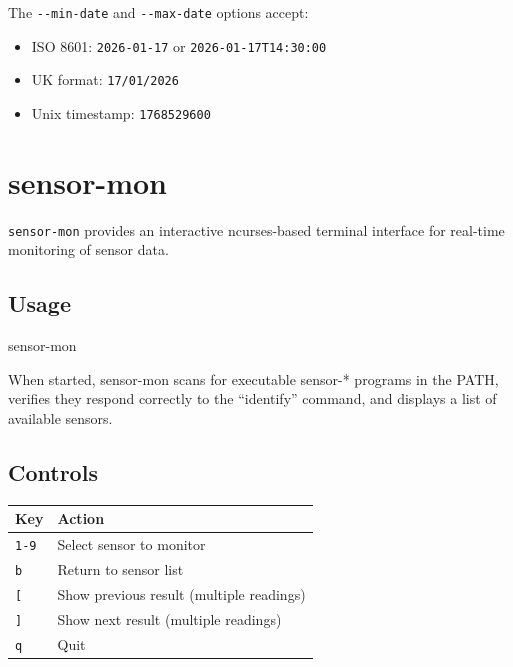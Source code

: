 \documentclass[
]{book}
\newenvironment{Shaded}{\begin{snugshade}}{\end{snugshade}}
\newcommand{\ExtensionTok}[1]{#1}
\providecommand{\tightlist}{%
  \setlength{\itemsep}{0pt}\setlength{\parskip}{0pt}}
\begin{document}
The \texttt{-\/-min-date} and \texttt{-\/-max-date} options accept:

\begin{itemize}
\tightlist
\item
  ISO 8601: \texttt{2026-01-17} or \texttt{2026-01-17T14:30:00}
\item
  UK format: \texttt{17/01/2026}
\item
  Unix timestamp: \texttt{1768529600}
\end{itemize}

\section{sensor-mon}\label{sensor-mon}

\texttt{sensor-mon} provides an interactive ncurses-based terminal interface for real-time monitoring of sensor data.

\subsection{Usage}\label{usage}

\begin{Shaded}
\begin{Highlighting}[]
\ExtensionTok{sensor{-}mon}
\end{Highlighting}
\end{Shaded}

When started, sensor-mon scans for executable sensor-* programs in the PATH, verifies they respond correctly to the ``identify'' command, and displays a list of available sensors.

\subsection{Controls}\label{controls}

{\def\LTcaptype{} %
\begin{longtable}[]{@{}ll@{}}
\toprule\noalign{}
Key & Action \\
\midrule\noalign{}
\endhead
\bottomrule\noalign{}
\endlastfoot
\texttt{1-9} & Select sensor to monitor \\
\texttt{b} & Return to sensor list \\
\texttt{{[}} & Show previous result (multiple readings) \\
\texttt{{]}} & Show next result (multiple readings) \\
\texttt{q} & Quit \\
\end{longtable}
}
\end{document}
